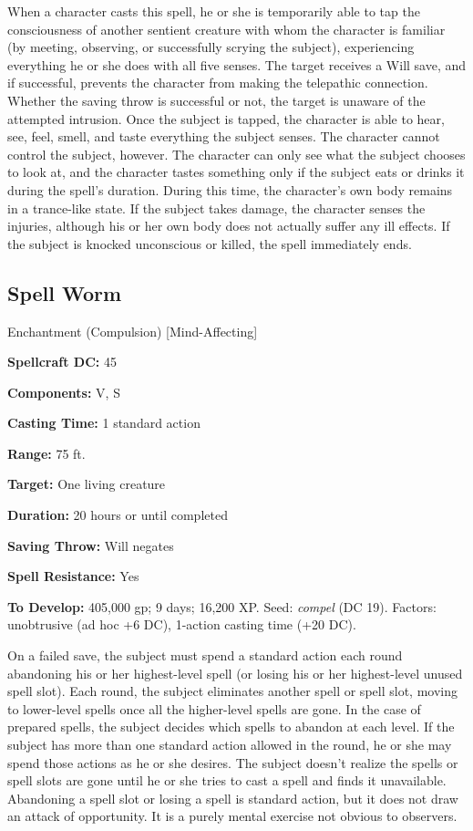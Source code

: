 \documentclass{article}
\begin{document}
When a character casts this spell, he or she is temporarily able to tap the consciousness 
of another sentient creature with whom the character is familiar (by meeting, observing, 
or successfully scrying the subject), experiencing everything he or she does with 
all five senses. The target receives a Will save, and if successful, prevents the 
character from making the telepathic connection. Whether the saving throw is successful 
or not, the target is unaware of the attempted intrusion. Once the subject is tapped, 
the character is able to hear, see, feel, smell, and taste everything the subject 
senses. The character cannot control the subject, however. The character can only 
see what the subject chooses to look at, and the character tastes something only 
if the subject eats or drinks it during the spell's duration. During this time, 
the character's own body remains in a trance-like state. If the subject takes damage, 
the character senses the injuries, although his or her own body does not actually 
suffer any ill effects. If the subject is knocked unconscious or killed, the spell 
immediately ends. 

\vspace{12pt}
\subsection*{Spell Worm }

Enchantment (Compulsion) [Mind-Affecting] 

\textbf{Spellcraft DC:} 45 

\textbf{Components:} V, S 

\textbf{Casting Time:} 1 standard action 

\textbf{Range:} 75 ft. 

\textbf{Target:} One living creature 

\textbf{Duration:} 20 hours or until completed 

\textbf{Saving Throw:} Will negates 

\textbf{Spell Resistance:} Yes 

\textbf{To Develop:} 405,000 gp; 9 days; 16,200 XP. Seed: \textit{compel }(DC 19). 
Factors: unobtrusive (ad hoc +6 DC), 1-action casting time (+20 DC). 

On a failed save, the subject must spend a standard action each round abandoning 
his or her highest-level spell (or losing his or her highest-level unused spell 
slot). Each round, the subject eliminates another spell or spell slot, moving to 
lower-level spells once all the higher-level spells are gone. In the case of prepared 
spells, the subject decides which spells to abandon at each level. If the subject 
has more than one standard action allowed in the round, he or she may spend those 
actions as he or she desires. The subject doesn't realize the spells or spell slots 
are gone until he or she tries to cast a spell and finds it unavailable. Abandoning 
a spell slot or losing a spell is standard action, but it does not draw an attack 
of opportunity. It is a purely mental exercise not obvious to observers. 
\end{document}
